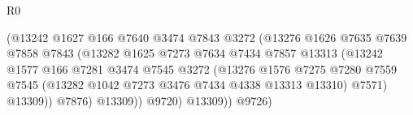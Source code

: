 \begin{lexlean}{R0}
\begin{coremodule}
                                          (@13242
                                            @1627
                                            @166
                                            @7640
                                            @3474
                                            @7843
                                            @3272
                                            (@13276
                                              @1626
                                              @7635
                                              @7639
                                              @7858
                                              @7843
                                              (@13282
                                                @1625
                                                @7273
                                                @7634
                                                @7434
                                                @7857
                                                @13313
                                                (@13242
                                                  @1577
                                                  @166
                                                  @7281
                                                  @3474
                                                  @7545
                                                  @3272
                                                  (@13276
                                                    @1576
                                                    @7275
                                                    @7280
                                                    @7559
                                                    @7545
                                                    (@13282
                                                      @1042
                                                      @7273
                                                      @3476
                                                      @7434
                                                      @4338
                                                      @13313
                                                      @13310)
                                                    @7571)
                                                  @13309))
                                              @7876)
                                            @13309))
                                        @9720)
                                      @13309))
                                  @9726)

\end{coremodule}
\end{lexlean}
